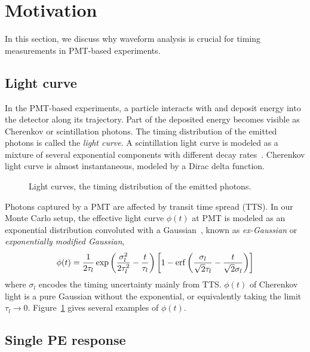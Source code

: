 \section{Motivation}
\label{sec:toyMC}

In this section, we discuss why waveform analysis is crucial for timing measurements in PMT-based experiments. 

\subsection{Light curve}
In the PMT-based experiments, a particle interacts with and deposit energy into the detector along its trajectory. Part of the deposited energy becomes visible as Cherenkov or scintillation photons.  The timing distribution of the emitted photons is called the \textit{light curve}.  A scintillation light curve is modeled as a mixture of several exponential components with different decay rates~\cite{rebber_particle_2021}.  Cherenkov light curve is 
almost instantaneous, modeled by a Dirac delta function. 

\begin{figure}[!htb]
  \centering
  \resizebox{0.5\textwidth}{!}{}
  \caption{\label{fig:time-pro} Light curves, the timing distribution of the emitted photons.}
\end{figure}

Photons captured by a PMT are affected by transit time spread (TTS).  In our Monte Carlo setup, the effective light curve $\phi(t)$ at PMT is modeled as an exponential distribution convoluted with a Gaussian~\cite{li_separation_2016}, known as \textit{ex-Gaussian} or \textit{exponentially modified Gaussian}, 
\begin{align}
    \phi(t) = \frac{1}{2\tau_l} \exp\left(\frac{\sigma_l^2}{2\tau_l^2}-\frac{t}{\tau_l}\right) \left[1 - \operatorname{erf}\left( \frac{\sigma_l}{\sqrt{2}\tau_l} - \frac{t}{\sqrt{2}\sigma_l} \right)\right]
    \label{eq:time-pro}
\end{align}
where $\sigma_l$ encodes the timing uncertainty mainly from TTS.  $\phi(t)$ of Cherenkov light is a pure Gaussian without the exponential, or equivalently taking the limit $\tau_l \rightarrow 0$.  Figure~\ref{fig:time-pro} gives several examples of $\phi(t)$.

\subsection{Single PE response}
\label{subsec:spe}

